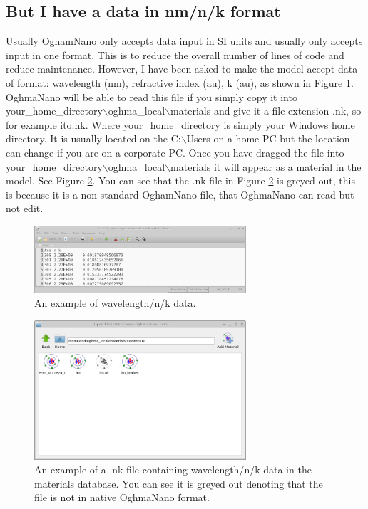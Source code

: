 \newpage
\subsection{But I have a data in nm/n/k format}
Usually OghamNano only accepts data input in SI units and usually only accepts input in one format. This is to reduce the overall number of lines of code and reduce maintenance. However, I have been asked to make the model accept data of format: wavelength (nm), refractive index (au), k (au), as shown in Figure \ref{fig:wavelength_n_k}. OghmaNano will be able to read this file if you simply copy it into your\_home\_directory$\backslash$oghma\_local$\backslash$materials and give it a file extension .nk, so for example ito.nk.  Where your\_home\_directory is simply your Windows home directory. It is usually located on the C:$\backslash$Users on a home PC but the location can change if you are on a corporate PC. Once you have dragged the file into your\_home\_directory$\backslash$oghma\_local$\backslash$materials it will appear as a material in the model. See Figure \ref{fig:nk_file}. You can see that the .nk file in Figure \ref{fig:nk_file} is greyed out, this is because it is a non standard OghamNano file, that OghmaNano can read but not edit.

\begin{figure}[H]
\centering
\includegraphics[width=0.7\textwidth]{images/database_materials/wavelength_n_k_example.png}
\caption{An example of wavelength/n/k data.}
\label{fig:wavelength_n_k}
\end{figure}

\begin{figure}[H]
\centering
\includegraphics[width=0.7\textwidth]{images/database_materials/nk_file.png}
\caption{An example of a .nk file containing  wavelength/n/k data in the materials database.  You can see it is greyed out denoting that the file is not in native OghmaNano format.}
\label{fig:nk_file}
\end{figure}

\newpage

